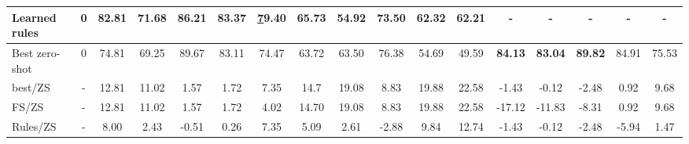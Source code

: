 \documentclass[sigconf,nonacm]{acmart}
\begin{document}
\begin{table*}[]
{\begin{tabular}{@{}l|c|ccccc|ccccc|ccccc@{}}
Learned rules                        & 0     & 82.81                        & 71.68                        & 86.21                        & 83.37                       & {\ul 79.40}                 & 65.73                        & 54.92                        & 73.50                        & 62.32                        & 62.21                        & -                             & -                             & -                            & -                            & \textbf{-}                  \\ \midrule
Best zero-shot                       & 0     & 74.81                        & 69.25                        & 89.67                        & 83.11                       & 74.47                       & 63.72                        & 63.50                        & 76.38                        & 54.69                        & 49.59                        & \textbf{84.13}                & \textbf{83.04}                & \textbf{89.82}               & 84.91                        & 75.53                       \\ \midrule
 best/ZS                        & -     & {\color[HTML]{6434FC} 12.81} & {\color[HTML]{6434FC} 11.02} & {\color[HTML]{6434FC} 1.57}  & {\color[HTML]{6434FC} 1.72} & {\color[HTML]{6434FC} 7.35} & {\color[HTML]{6434FC} 14.7}  & {\color[HTML]{6434FC} 19.08} & {\color[HTML]{6434FC} 8.83}  & {\color[HTML]{6434FC} 19.88} & {\color[HTML]{6434FC} 22.58} & {\color[HTML]{FE0000} -1.43}  & {\color[HTML]{FE0000} -0.12}  & {\color[HTML]{FE0000} -2.48} & {\color[HTML]{6434FC} 0.92}  & {\color[HTML]{6434FC} 9.68} \\
 FS/ZS                          & -     & {\color[HTML]{6434FC} 12.81} & {\color[HTML]{6434FC} 11.02} & {\color[HTML]{6434FC} 1.57}  & {\color[HTML]{6434FC} 1.72} & {\color[HTML]{6434FC} 4.02} & {\color[HTML]{6434FC} 14.70} & {\color[HTML]{6434FC} 19.08} & {\color[HTML]{6434FC} 8.83}  & {\color[HTML]{6434FC} 19.88} & {\color[HTML]{6434FC} 22.58} & {\color[HTML]{FE0000} -17.12} & {\color[HTML]{FE0000} -11.83} & {\color[HTML]{FE0000} -8.31} & {\color[HTML]{6434FC} 0.92}  & {\color[HTML]{6434FC} 9.68} \\
 Rules/ZS                       & -     & {\color[HTML]{6434FC} 8.00}  & {\color[HTML]{6434FC} 2.43}  & {\color[HTML]{FE0000} -0.51} & {\color[HTML]{6434FC} 0.26} & {\color[HTML]{6434FC} 7.35} & {\color[HTML]{6434FC} 5.09}  & {\color[HTML]{6434FC} 2.61}  & {\color[HTML]{FE0000} -2.88} & {\color[HTML]{6434FC} 9.84}  & {\color[HTML]{6434FC} 12.74} & {\color[HTML]{FE0000} -1.43}  & {\color[HTML]{FE0000} -0.12}  & {\color[HTML]{FE0000} -2.48} & {\color[HTML]{FE0000} -5.94} & {\color[HTML]{6434FC} 1.47} \\ \bottomrule
\end{tabular}}
\end{table*} 
\end{document}
